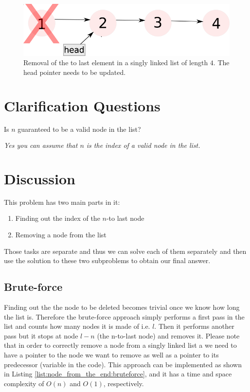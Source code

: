 \begin{figure}
	\label{fig:node_from_the_end:example2}
	\centering
	\includegraphics[scale=1.0]{sources/node_from_the_end/images/example2}
	\caption{Removal of the  to last element in a singly linked list of length $4$. The head pointer needs to be updated.}
\end{figure}


\section{Clarification Questions}

\begin{QandA}
	\item Is $n$ guaranteed to be a valid node in the list?
	\begin{answered}
		\textit{Yes you can assume that $n$ is the index of a valid node in the list.}
	\end{answered}
\end{QandA}

\section{Discussion}
\label{node_from_the_end:sec:discussion}
This problem has two main parts in it: 
\begin{enumerate}
	\item Finding out the index of the $n$-to last node
	\item Removing a node from the list
\end{enumerate}
Those tasks are separate and thus we can solve each of them separately and then use the solution to these two subproblems to obtain our final answer.

\subsection{Brute-force}
\label{node_from_the_end:sec:bruteforce}
Finding out the the node to be deleted becomes trivial once we know how long the list is. Therefore the brute-force approach simply performs a first pass in the list and counts how many nodes it is made of i.e. $l$. Then it performs another pass but it stops at node $l-n$ (the n-to-last node) and removes it.
Please note that in order to correctly remove a node from a singly linked list a we need to have a pointer to the node we want to remove as well as a pointer to its predecessor (variable  in the code). This approach can be implemented as shown in Listing \ref{list:node_from_the_end:bruteforce}, and it has a time and space complexity of  $O(n)$ and $O(1)$, respectively.


